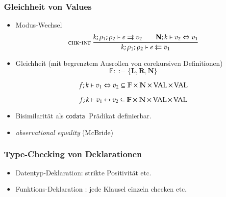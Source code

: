 \documentclass[12pt,red,serif,mathserif]{beamer}
\newcommand{\codata}{\mathsf{codata}\:}
\newcommand{\rulename}[1]{\ensuremath{\mbox{\sc#1}}}
\newcommand{\ru}{\dfrac}
\newcommand{\nru}[3]{#1\ \ru{#2}{#3}}
\newcommand{\chkinf}{\rulename{chk-inf}}
\newcommand{\cN}{\mathbb{N}}
\newcommand{\cF}{\mathbb{F}}
\newcommand{\nF}{\mathbf{N}}
\newcommand{\lF}{\mathbf{L}}
\newcommand{\rF}{\mathbf{R}}
\newcommand{\opn}[1]{\operatorname{#1}}
\newcommand{\Val}{\opn{VAL}}
\begin{document}
\frame
{


\frametitle{Gleichheit von Values}

\begin{itemize}
\item Modus-Wechsel
\[
\nru{\chkinf}
{\Infer{k}{\rho_1}{\rho_2}{e}{v_2}
\qquad
{\EqVal{\nF}{k}{v_2}{v_1}}}
{\Check{k}{\rho_1}{\rho_2}{e}{v_1}}
\]
\item Gleichheit (mit begrenztem Ausrollen von corekursiven Definitionen)
\[ \cF ::= \{\lF, \rF, \nF \} \]

\[\EqVal{f}{k}{v_1}{v_2} \subseteq \cF \times \cN \times \Val \times \Val \]

\[\FeqVal{f}{k}{v_1}{v_2} \subseteq \cF \times \cN \times\Val \times \Val \]
\item
Bisimilarit\"at als $\codata$ Pr\"adikat definierbar.
\item
\emph{observational equality} (McBride)
\end{itemize}
}

\frame
{

\frametitle{Type-Checking von Deklarationen}

\begin{itemize}
\item
Datentyp-Deklaration: strikte Positivit\"at etc.
\item
Funktions-Deklaration : jede Klausel einzeln checken etc.
\end{itemize}

}
\end{document}
